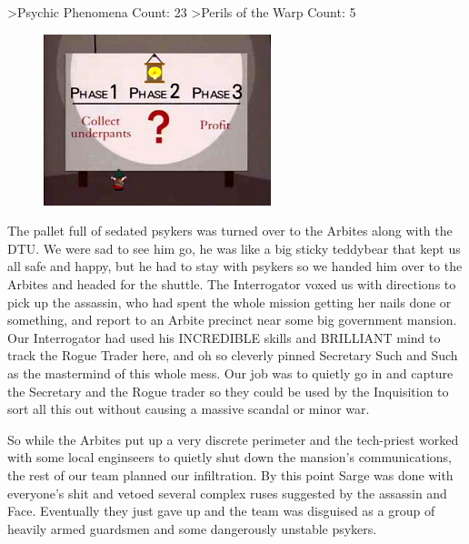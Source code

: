 >Psychic Phenomena Count: 23
>Perils of the Warp Count: 5

\begin{figure}
\begin{center}
	\includegraphics[width=\figwidth]{pics/3/22.png}
\end{center}
\end{figure}
The pallet full of sedated psykers was turned over to the Arbites along with the DTU. 
We were sad to see him go, he was like a big sticky teddybear that kept us all safe and happy, but he had to stay with psykers so we handed him over to the Arbites and headed for the shuttle. 
The Interrogator voxed us with directions to pick up the assassin, who had spent the whole mission getting her nails done or something, and report to an Arbite precinct near some big government mansion. 
Our Interrogator had used his INCREDIBLE skills and BRILLIANT mind to track the Rogue Trader here, and oh so cleverly pinned Secretary Such and Such as the mastermind of this whole mess. 
Our job was to quietly go in and capture the Secretary and the Rogue trader so they could be used by the Inquisition to sort all this out without causing a massive scandal or minor war.

So while the Arbites put up a very discrete perimeter and the tech-priest worked with some local enginseers to quietly shut down the mansion’s communications, the rest of our team planned our infiltration. 
By this point Sarge was done with everyone’s shit and vetoed several complex ruses suggested by the assassin and Face. 
Eventually they just gave up and the team was disguised as a group of heavily armed guardsmen and some dangerously unstable psykers.

